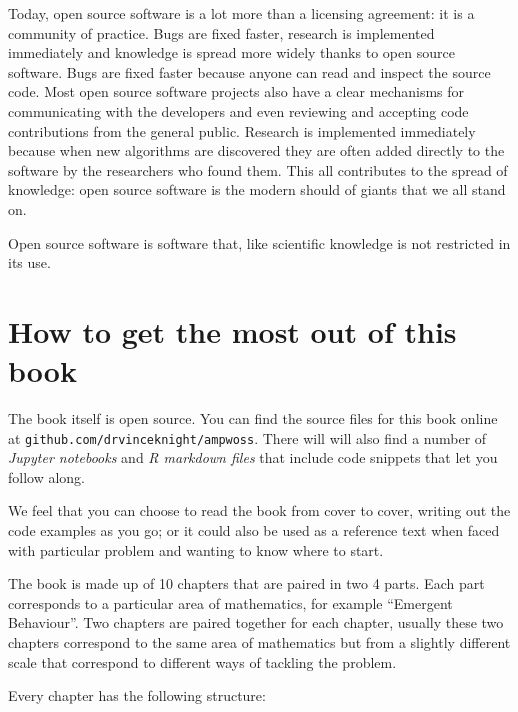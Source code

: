 Today, open source software is a lot more than a licensing agreement:
it is a community of practice. Bugs are fixed faster, research is
implemented immediately and knowledge is spread more widely thanks to
open source software. Bugs are fixed faster because anyone can read and
inspect the source code. Most open source software projects also have a
clear mechanisms for communicating with the developers and even
reviewing and accepting code contributions from the general public.
Research is implemented immediately because when new algorithms are
discovered they are often added directly to the software by the
researchers who found them. This all contributes to the spread of
knowledge: open source software is the modern should of giants that we
all stand on.

Open source software is software that, like scientific knowledge is not
restricted in its use.

\section{How to get the most out of this
book}\label{sec:how-to-get-the-most-out-of-this-book}

The book itself is open source. You can find the source files for this
book online at \texttt{github.com/drvinceknight/ampwoss}. There will will
also find a number of \emph{Jupyter notebooks} and \emph{R markdown
files} that include code snippets that let you follow along.

We feel that you can choose to read the book from cover to cover,
writing out the code examples as you go; or it could also be used as a
reference text when faced with particular problem and wanting to know
where to start.

The book is made up of 10 chapters that are paired in two 4 parts. Each
part corresponds to a particular area of mathematics, for example
``Emergent Behaviour''. Two chapters are paired together for each
chapter, usually these two chapters correspond to the same area of
mathematics but from a slightly different scale that correspond to
different ways of tackling the problem.

Every chapter has the following structure:

